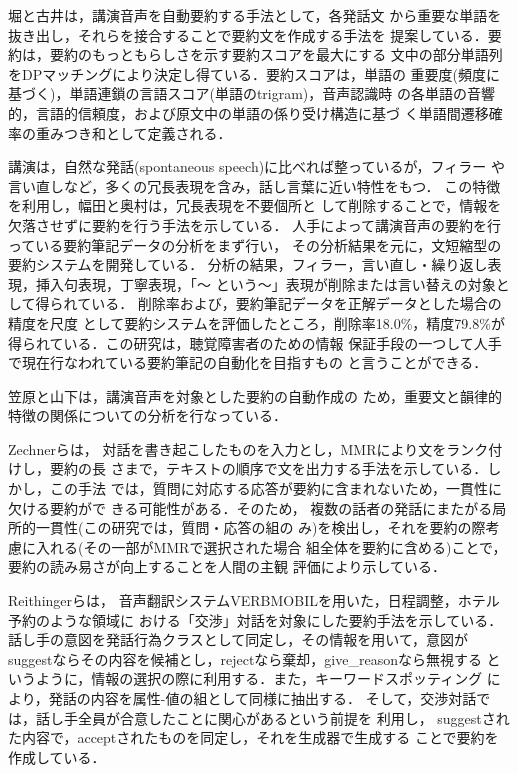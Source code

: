 堀と古井\cite{hori:01:a}は，講演音声を自動要約する手法として，各発話文
から重要な単語を抜き出し，それらを接合することで要約文を作成する手法を
提案している．要約は，要約のもっともらしさを示す要約スコアを最大にする
文中の部分単語列をDPマッチングにより決定し得ている．要約スコアは，単語の
重要度(頻度に基づく)，単語連鎖の言語スコア(単語のtrigram)，音声認識時
の各単語の音響的，言語的信頼度，および原文中の単語の係り受け構造に基づ
く単語間遷移確率の重みつき和として定義される．

講演は，自然な発話(spontaneous speech)に比べれば整っているが，フィラー
や言い直しなど，多くの冗長表現を含み，話し言葉に近い特性をもつ．
この特徴を利用し，幅田と奥村\cite{habata:01:a}は，冗長表現を不要個所と
して削除することで，情報を欠落させずに要約を行う手法を示している．
人手によって講演音声の要約を行っている要約筆記データの分析をまず行い，
その分析結果を元に，文短縮型の要約システムを開発している．
分析の結果，フィラー，言い直し・繰り返し表現，挿入句表現，丁寧表現，「〜
という〜」表現が削除または言い替えの対象として得られている．
削除率および，要約筆記データを正解データとした場合の精度を尺度
として要約システムを評価したところ，削除率18.0\%，精度79.8\%が
得られている．この研究は，聴覚障害者のための情報
保証手段の一つして人手で現在行なわれている要約筆記の自動化を目指すもの
と言うことができる．

笠原と山下\cite{kasahara:01:a}は，講演音声を対象とした要約の自動作成の
ため，重要文と韻律的特徴の関係についての分析を行なっている．

Zechnerら\cite{zechner:01:a}は，
対話を書き起こしたものを入力とし，MMRにより文をランク付けし，要約の長
さまで，テキストの順序で文を出力する手法を示している．しかし，この手法
では，質問に対応する応答が要約に含まれないため，一貫性に欠ける要約がで
きる可能性がある．そのため，
複数の話者の発話にまたがる局所的一貫性(この研究では，質問・応答の組の
み)を検出し，それを要約の際考慮に入れる(その一部がMMRで選択された場合
組全体を要約に含める)ことで，要約の読み易さが向上することを人間の主観
評価により示している．

Reithingerら\cite{reithinger:00:a}は，
音声翻訳システムVERBMOBILを用いた，日程調整，ホテル予約のような領域に
おける「交渉」対話を対象にした要約手法を示している．
話し手の意図を発話行為クラスとして同定し，その情報を用いて，意図が
suggestならその内容を候補とし，rejectなら棄却，give\_reasonなら無視する 
というように，情報の選択の際に利用する．また，キーワードスポッティング
により，発話の内容を属性-値の組として同様に抽出する．
そして，交渉対話では，話し手全員が合意したことに関心があるという前提を
利用し，
suggestされた内容で，acceptされたものを同定し，それを生成器で生成する
ことで要約を作成している．

